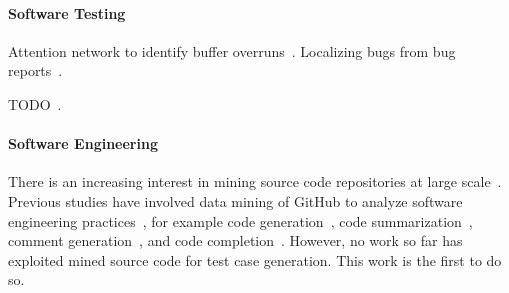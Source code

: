 \paragraph{Software Testing} Attention network to identify buffer overruns~\cite{Choi2016}. Localizing bugs from bug reports~\cite{Lam2016,Huo2016}.

TODO~\cite{White2016}.

\paragraph{Software Engineering} There is an increasing interest in mining source code repositories at large scale~\cite{Allamanis2013a,White2015a,Bird2009}. Previous studies have involved data mining of GitHub to analyze software engineering practices~\cite{Wu2014,Guzman2014,Baishakhi2014a,Vasilescu2015}, for example code generation~\cite{Zhang2015a}, code summarization~\cite{Allamanis2016}, comment generation~\cite{Wong2013}, and code completion~\cite{Raychev2014}. However, no work so far has exploited mined source code for test case generation. This work is the first to do so.